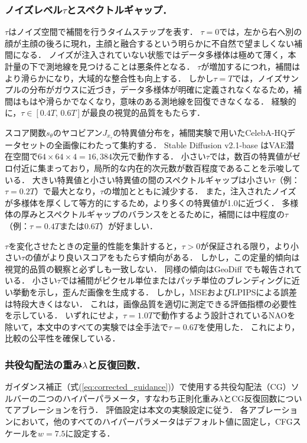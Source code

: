 \documentclass[MIRU,submit]{miru2026j}
\theoremstyle{definition}
\begin{document}
\subsubsection{ノイズレベル$\tau$とスペクトルギャップ．}
$\tau$はノイズ空間で補間を行うタイムステップを表す．
$\tau=0$では，左から右へ別の顔が主顔の後ろに現れ，主顔と融合するという明らかに不自然で望ましくない補間になる．
ノイズが注入されていない状態ではデータ多様体は極めて薄く，本計量の下で測地線を見つけることは悪条件となる．
$\tau$が増加するにつれ，補間はより滑らかになり，大域的な整合性も向上する．
しかし$\tau=T$では，ノイズサンプルの分布がガウスに近づき，データ多様体が明確に定義されなくなるため，補間はもはや滑らかでなくなり，意味のある測地線を回復できなくなる．
経験的に，$\tau \in [0.4T,\,0.6T]$が最良の視覚的品質をもたらす．

スコア関数$s_\theta$のヤコビアン$J_{x_\tau}$の特異値分布を，補間実験で用いたCelebA-HQデータセットの全画像にわたって集約する．
Stable Diffusion v2.1-base \cite{Rombach2022}はVAE潜在空間で$64\times 64\times 4=16{,}384$次元で動作する．
小さい$\tau$では，数百の特異値がゼロ付近に集まっており，局所的な内在的次元数が数百程度であることを示唆している．
大きい特異値と小さい特異値の間のスペクトルギャップは小さい$\tau$（例：$\tau=0.2T$）で最大となり，$\tau$の増加とともに減少する．
また，注入されたノイズが多様体を厚くして等方的にするため，より多くの特異値が1.0に近づく．
多様体の厚みとスペクトルギャップのバランスをとるために，補間には中程度の$\tau$（例：$\tau=0.4T$または$0.6T$）が好ましい．

$\tau$を変化させたときの定量的性能を集計すると，$\tau > 0$が保証される限り，より小さい$\tau$の値がより良いスコアをもたらす傾向がある．
しかし，この定量的傾向は視覚的品質の観察と必ずしも一致しない．
同様の傾向はGeoDiff \cite{Yu2025}でも報告されている．
小さい$\tau$では補間がピクセル単位またはパッチ単位のブレンディングに近い挙動を示し，歪んだ画像を生成する．
しかし，MSEおよびLPIPSによる誤差は特段大きくはない．
これは，画像品質を適切に測定できる評価指標の必要性を示している．
いずれにせよ，$\tau=1.0T$で動作するよう設計されているNAOを除いて，本文中のすべての実験では全手法で$\tau = 0.6T$を使用した．
これにより，比較の公平性を確保している．

\subsubsection{共役勾配法の重み$\lambda$と反復回数．}
ガイダンス補正（式(\ref{eq:corrected_guidance})）で使用する共役勾配法（CG）ソルバーの二つのハイパーパラメータ，すなわち正則化重み$\lambda$とCG反復回数についてアブレーションを行う．
評価設定は本文の実験設定に従う．
各アブレーションにおいて，他のすべてのハイパーパラメータはデフォルト値に固定し，CFGスケールを$w=7.5$に設定する．
\end{document}
